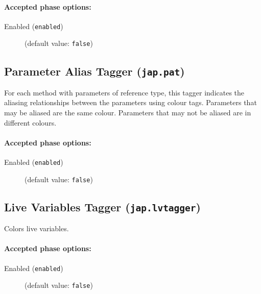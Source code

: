 \documentclass{article}
\begin{document}
\paragraph{Accepted phase options:} 

\begin{description}

\item[Enabled ({\tt enabled})]
(default value: {\tt false})






\end{description}

\subsection{Parameter Alias Tagger ({\tt jap.pat})}
For each method with parameters of reference type, this tagger indicates the aliasing relationships between the parameters using colour tags. Parameters that may be aliased are the same colour. Parameters that may not be aliased are in different colours.

\paragraph{Accepted phase options:} 

\begin{description}

\item[Enabled ({\tt enabled})]
(default value: {\tt false})






\end{description}

\subsection{Live Variables Tagger ({\tt jap.lvtagger})}
Colors live variables.

\paragraph{Accepted phase options:} 

\begin{description}

\item[Enabled ({\tt enabled})]
(default value: {\tt false})






\end{description}
\end{document}
